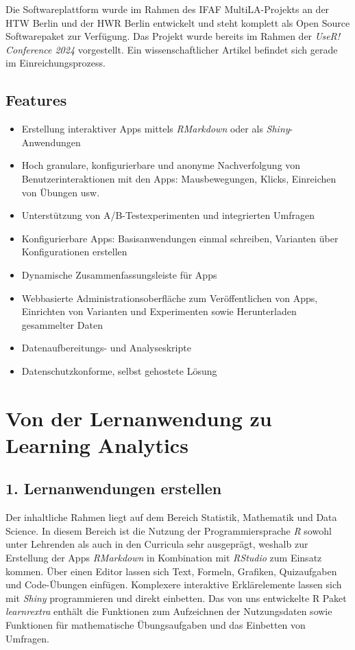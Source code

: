 \documentclass[a0,portrait]{a0poster}
\begin{document}
\begin{multicols}{2}
Die Softwareplattform wurde im Rahmen des IFAF MultiLA-Projekts an der HTW Berlin und der HWR Berlin entwickelt und steht komplett als Open Source Softwarepaket zur Verfügung. Das Projekt wurde bereits im Rahmen der \textit{UseR! Conference 2024} \cite{userconf24} vorgestellt. Ein wissenschaftlicher Artikel befindet sich gerade im Einreichungsprozess.

\subsection*{Features}

\begin{itemize}
    \item Erstellung interaktiver Apps mittels \textit{RMarkdown} oder als \textit{Shiny}-Anwendungen
    \item Hoch granulare, konfigurierbare und anonyme Nachverfolgung von Benutzerinteraktionen mit den Apps: Mausbewegungen, Klicks, Einreichen von Übungen usw.
    \item Unterstützung von A/B-Testexperimenten und integrierten Umfragen
    \item Konfigurierbare Apps: Basisanwendungen einmal schreiben, Varianten über Konfigurationen erstellen
    \item Dynamische Zusammenfassungsleiste für Apps
    \item Webbasierte Administrationsoberfläche zum Veröffentlichen von Apps, Einrichten von Varianten und Experimenten sowie Herunterladen gesammelter Daten
    \item Datenaufbereitungs- und Analyseskripte
    \item Datenschutzkonforme, selbst gehostete Lösung
\end{itemize}

\section*{Von der Lernanwendung zu Learning Analytics}

\subsection*{1. Lernanwendungen erstellen}

Der inhaltliche Rahmen liegt auf dem Bereich Statistik, Mathematik und Data Science. In diesem Bereich ist die Nutzung der Programmiersprache \textit{R} sowohl unter Lehrenden als auch in den Curricula sehr ausgeprägt, weshalb zur Erstellung der Apps \textit{RMarkdown} in Kombination mit \textit{RStudio} zum Einsatz kommen. Über einen Editor lassen sich Text, Formeln, Grafiken, Quizaufgaben und Code-Übungen einfügen. Komplexere interaktive Erklärelemente lassen sich mit \textit{Shiny} programmieren und direkt einbetten. Das von uns entwickelte R Paket \textit{learnrextra} \cite{konrad_ifafmultilalearnrextra_2024} enthält die Funktionen zum Aufzeichnen der Nutzungsdaten sowie Funktionen für mathematische Übungsaufgaben und das Einbetten von Umfragen.


\end{multicols}
\end{document}
